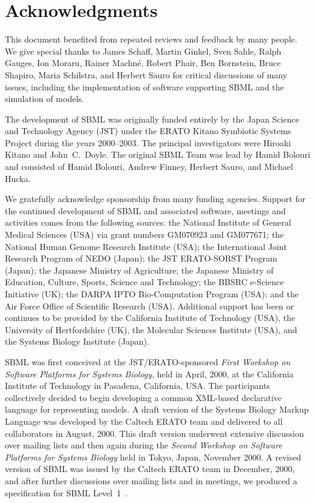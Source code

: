 
\section{Acknowledgments}
\label{sec:acknowledgements}
\label{sec:acknowledgments}

This document benefited from repeated reviews and feedback by many
people.  We give special thanks to James Schaff, Martin Ginkel,
Sven Sahle, Ralph Gauges, Ion Moraru, Rainer Machn\'{e}, Robert
Phair, Ben Bornstein, Bruce Shapiro, Maria Schilstra, and Herbert
Sauro for critical discussions of many issues, including the
implementation of software supporting SBML and the
simulation of models.

The development of SBML was originally funded entirely by the
Japan Science and Technology Agency (JST) under the ERATO Kitano
Symbiotic Systems Project during the years 2000--2003.  The
principal investigators were Hiroaki Kitano and John~C.\ Doyle.
The original SBML Team was lead by Hamid Bolouri and consisted of
Hamid Bolouri, Andrew Finney, Herbert Sauro, and Michael Hucka.

We gratefully acknowledge sponsorship from many funding agencies.
Support for the continued development of SBML and associated
software, meetings and activities comes from the following
sources: the National Institute of General Medical Sciences (USA)
via grant numbers GM070923 and GM077671; the National Human Genome
Research Institute (USA); the International Joint Research Program
of NEDO (Japan); the JST ERATO-SORST Program (Japan); the Japanese
Ministry of Agriculture; the Japanese Ministry of Education,
Culture, Sports, Science and Technology; the BBSRC e-Science
Initiative (UK); the DARPA IPTO Bio-Computation Program (USA); and
the Air Force Office of Scientific Research (USA).  Additional
support has been or continues to be provided by the California
Institute of Technology (USA), the University of Hertfordshire
(UK), the Molecular Sciences Institute (USA), and the Systems
Biology Institute (Japan).

SBML was first conceived at the JST/ERATO-sponsored \emph{First
  Workshop on Software Platforms for Systems Biology}, held in
April, 2000, at the California Institute of Technology in
Pasadena, California, USA.  The participants collectively decided
to begin developing a common XML-based declarative language for
representing models.  A draft version of the Systems Biology
Markup Language was developed by the Caltech ERATO team and
delivered to all collaborators in August, 2000.  This draft
version underwent extensive discussion over mailing lists and then
again during the \emph{Second Workshop on Software Platforms for
  Systems Biology} held in Tokyo, Japan, November 2000.  A revised
version of SBML was issued by the Caltech ERATO team in December,
2000, and after further discussions over mailing lists and in
meetings, we produced a specification for SBML
Level~1~\citep{hucka:2001}.

